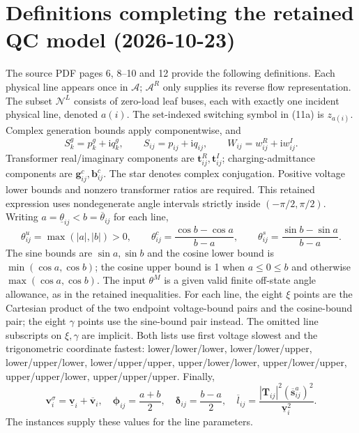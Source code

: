\documentclass{article}
\begin{document}
\section{Definitions completing the retained QC model (2026-10-23)}
The source PDF pages 6, 8--10 and 12 provide the following definitions.
Each physical line appears once in $\mathcal A$; $\mathcal A^R$ only supplies
its reverse flow representation. The subset $\mathcal N^L$ consists of
zero-load leaf buses, each with exactly one incident physical line, denoted
$a(i)$. The set-indexed switching symbol in (11a) is $z_{a(i)}$.
Complex generation bounds apply componentwise, and
\[
 S_k^g=p_k^g+\mathrm{i}q_k^g,\qquad
 S_{ij}=p_{ij}+\mathrm{i}q_{ij},\qquad
 W_{ij}=w_{ij}^R+\mathrm{i}w_{ij}^I.
\]
Transformer real/imaginary components are $\boldsymbol t_{ij}^R,\boldsymbol t_{ij}^I$;
charging-admittance components are $\boldsymbol g_{ij}^c,\boldsymbol b_{ij}^c$.
The star denotes complex conjugation. Positive voltage lower bounds and
nonzero transformer ratios are required. This retained expression uses
nondegenerate angle intervals strictly inside $(-\pi/2,\pi/2)$.
Writing $a=\underline\theta_{ij}<b=\overline\theta_{ij}$ for each line,
\[
 \theta_{ij}^u=\max(|a|,|b|)>0,\qquad
 \theta_{ij}^c=\frac{\cos b-\cos a}{b-a},\qquad
 \theta_{ij}^s=\frac{\sin b-\sin a}{b-a}.
\]
The sine bounds are $\sin a,\sin b$ and the cosine lower bound is
$\min(\cos a,\cos b)$; the cosine upper bound is 1 when $a\le0\le b$
and otherwise $\max(\cos a,\cos b)$. The input $\theta^M$ is a given
valid finite off-state angle allowance, as in the retained inequalities.
For each line, the eight $\xi$ points are the Cartesian product of the two
endpoint voltage-bound pairs and the cosine-bound pair; the eight $\gamma$
points use the sine-bound pair instead. The omitted line subscripts on
$\xi,\gamma$ are implicit. Both lists use first voltage slowest and the
trigonometric coordinate fastest: lower/lower/lower, lower/lower/upper,
lower/upper/lower, lower/upper/upper, upper/lower/lower,
upper/lower/upper, upper/upper/lower, upper/upper/upper.
Finally,
\[
 \boldsymbol v_i^\sigma=\underline{\boldsymbol v}_i+\overline{\boldsymbol v}_i,
 \quad\boldsymbol\phi_{ij}=\frac{a+b}{2},
 \quad\boldsymbol\delta_{ij}=\frac{b-a}{2},
 \quad\overline l_{ij}=\frac{|\boldsymbol T_{ij}|^2(\overline{\boldsymbol s}_{ij}^a)^2}
 {\underline{\boldsymbol v}_i^2}.
\]
The instances supply these values for the line parameters.
\end{document}
